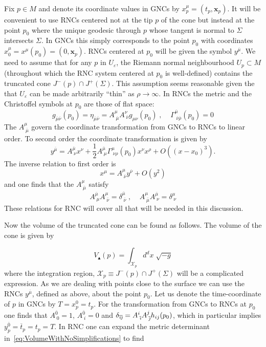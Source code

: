 \documentclass[12pt]{article}
\newcommand{\be}{\begin{equation}}
\newcommand{\ee}{\end{equation}}
\newcommand{\mb}[1]{\marginnote{\texttt{\small MB:\,#1}}}
\newcommand{\ibar}{{\overline{\emph\i}}}
\newcommand{\jbar}{{\overline{\emph\j}}}
\begin{document}
Fix $p\in M$ and denote its coordinate values in GNCs by $x^\mu_p=(t_p,\mathbf x_p)$. It will be convenient to use RNCs centered not at the tip $p$ of the cone but instead at the point $p_0$ where the unique geodesic through $p$ whose tangent is normal to $\Sigma$ intersects $\Sigma$. In GNCs this simply corresponds to the point $p_0$ with coordinates $x_0^\mu=x^\mu(p_0)=(0,\mathbf x_p)$. RNCs centered at $p_0$ will be given the symbol $y^{\overline{\mu}}$.
We need to assume that for any $p$ in $U_\varepsilon$, the Riemann normal neighbourhood $U_p\subset M$ (throughout which the RNC system centered at $p_0$ is well-defined) contains the truncated cone $J^-(p)\cap J^+(\Sigma)$. This assumption seems reasonable given the that $U_\varepsilon$ can be made arbitrarily ``thin'' as $\rho\rightarrow\infty$. In RNCs the metric and the Christoffel symbols at $p_0$ are those of flat space:
\be\label{eq:RNCMetricTransAtPAndChris}
g_{\overline{\mu} \overline{\nu}}(p_0)=\eta_{\overline{\mu} \overline{\nu}}=A^{\mu}_{\;\overline{\mu}}A^{\nu}_{\;\overline{\nu}}g_{\mu\nu}(p_0)\;,\;\;\;\;\Gamma^{\overline{\mu}}_{\;\overline{\nu}\overline{\rho}}(p_0)=0
\ee
The $A^{\mu}_{\;\overline{\mu}}$ govern the coordinate transformation from GNCs to RNCs to linear order. %
To second order the coordinate transformation is given by
\be\label{eq:RNCtotaltrans}
y^{\overline{\mu}}=A^{\overline{\mu}}_{\;\nu}x^\nu+\frac{1}{2}A^{\overline{\mu}}_{\;\mu}\Gamma^{\mu}_{\;\nu\rho}(p_0)x^\nu x^\rho+O((x-x_0)^3).
\ee
The inverse relation to first order is 
\be\label{eq:RNCinversetrans}
x^{\mu}=A^{\mu}_{\;\overline{\nu}}y^{\overline{\nu}}+O(y^2)
\ee
and one finds that the $A^{\mu}_{\;\overline{\mu}}$ satisfy
\be\label{eq:RNCeqnforA}
A^{\overline{\mu}}_{\;\mu}A^{\mu}_{\;\overline{\nu}}=\delta^{\overline{\mu}}_{\;\overline{\nu}}\;,\;\;\;\;A^{\mu}_{\;\overline{\mu}}A^{\overline{\mu}}_{\;\nu}=\delta^{\mu}_{\;\nu}
\ee
These relations for RNC will cover all that will be needed in this discussion.

Now the volume of the truncated cone can be found as follows. 
The volume of the cone is given by

\be\label{eq:VolumeWithNoSimplifications}
V_\blacktriangle(p)=\int_{\mathcal{X}_p} d^d x\;\sqrt{-g}
\ee
where the integration region, $\mathcal{X}_p\equiv  J^-(p)\cap J^+(\Sigma)$ will be a complicated expression. As we are dealing with points close to the surface we can use the  RNCs $y^{\overline{\mu}}$, defined as above, about the point $p_0$. Let us denote the time-coordinate of $p$ in GNCs by $T=x^0_p=t_p$. For the transformation from GNCs to RNCs at $p_0$ one finds that $A^{\overline 0}_{\;0}=1$, $A^{\overline 0}_{\;i}=0$ and $\delta_{\ibar\jbar}=A^i_{\;\ibar}A^j_{\;\jbar}h_{ij}(p_0)$, which in particular implies $y^{\overline{0}}_p=\overline{t}_p=t_p=T$. In RNC one can expand the metric determinant in~\eqref{eq:VolumeWithNoSimplifications} to find
\end{document}
